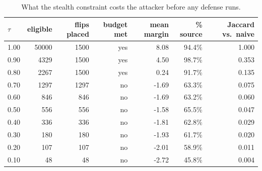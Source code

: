 \begin{table}[t]
\centering
\small
\begin{tabular}{lrrrrrr}
\toprule
$\tau$ & eligible & flips placed & budget met & mean margin & \% source & Jaccard vs.\ naive \\
\midrule
1.00 & 50000 & 1500 & yes & 8.08 & 94.4\% & 1.000 \\
0.90 & 4329 & 1500 & yes & 4.50 & 98.7\% & 0.353 \\
0.80 & 2267 & 1500 & yes & 0.24 & 91.7\% & 0.135 \\
0.70 & 1297 & 1297 & no & -1.69 & 63.3\% & 0.075 \\
0.60 & 846 & 846 & no & -1.69 & 63.2\% & 0.060 \\
0.50 & 556 & 556 & no & -1.58 & 65.5\% & 0.047 \\
0.40 & 336 & 336 & no & -1.81 & 62.8\% & 0.029 \\
0.30 & 180 & 180 & no & -1.93 & 61.7\% & 0.020 \\
0.20 & 107 & 107 & no & -2.01 & 58.9\% & 0.011 \\
0.10 & 48 & 48 & no & -2.72 & 45.8\% & 0.004 \\
\bottomrule
\end{tabular}
\caption{What the stealth constraint costs the attacker before any defense runs.}
\label{tab:attacker_cost}
\end{table}
